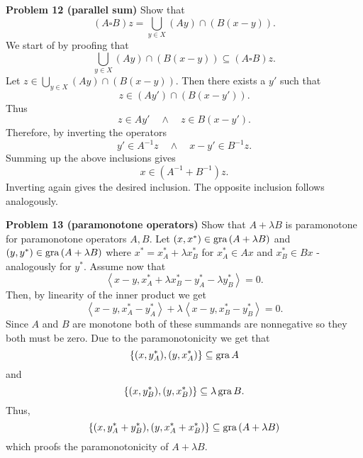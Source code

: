 \documentclass{scrartcl}
\newcommand{\sub}{\subseteq}
\theoremstyle{plain}
\theoremstyle{remark}
\newcommand{\gr}{\textup{gra}\,}
\begin{document}
\textbf{Problem 12 (parallel sum)} Show that
\begin{equation}
  (A \square B)z = \bigcup_{y \in X} (Ay) \cap (B(x-y)).
\end{equation}
We start of by proofing that
\begin{equation}
  \bigcup_{y \in X} (Ay) \cap (B(x-y)) \sub (A \square B)z.
\end{equation}
Let $z \in \bigcup_{y \in X} (Ay) \cap (B(x-y))$.
Then there exists a $y'$ such that
\begin{equation}
  z \in (Ay') \cap (B(x-y')).
\end{equation}
Thus 
\begin{equation}
  z \in A y' \quad \wedge \quad z \in B(x-y').
\end{equation}
Therefore, by inverting the operators
\begin{equation}
  y' \in A^{-1} z \quad \wedge \quad x - y' \in B^{-1}z.
\end{equation}
Summing up the above inclusions gives
\begin{equation}
  x \in (A^{-1} + B^{-1})z.
\end{equation}
Inverting again gives the desired inclusion. The opposite inclusion follows analogously.

\textbf{Problem 13 (paramonotone operators)} Show that $A+\lambda B$ is paramonotone for paramonotone operators $A,B$.
Let $(x,x^*) \in  \gr (A+\lambda B)$ and $(y,y^*) \in \gr (A + \lambda B)$ where $x^* = x_A^* + \lambda x_B^*$ for $x_A^* \in Ax$ and $x_B^* \in Bx$ - analogously for $y^*$.
Assume now that
\begin{equation}
  \left\langle x-y, x_A^* + \lambda x_B^* - y_A^* - \lambda y_B^* \right\rangle = 0.
\end{equation}
Then, by linearity of the inner product we get
\begin{equation}
  \left\langle x-y, x_A^*  - y_A^*  \right\rangle + \lambda \left\langle x-y, x_B^* - y_B^* \right\rangle = 0.
\end{equation}
Since $A$ and $B$ are monotone both of these summands are nonnegative so they both must be zero.
Due to the paramonotonicity we get that
\begin{equation}
  \{(x,y_A^*), (y, x_A^*) \} \sub \gr A
\end{equation}
and
\begin{equation}
  \{(x,y_B^*), (y, x_B^*) \} \sub \lambda \, \gr B.
\end{equation}
Thus,
\begin{equation}
  \{(x, y_A^* + y_B^*), (y, x_A^* + x_B^*)\} \sub \gr (A + \lambda B)
\end{equation}
which proofs the paramonotonicity of $A+\lambda B$.
\end{document}

